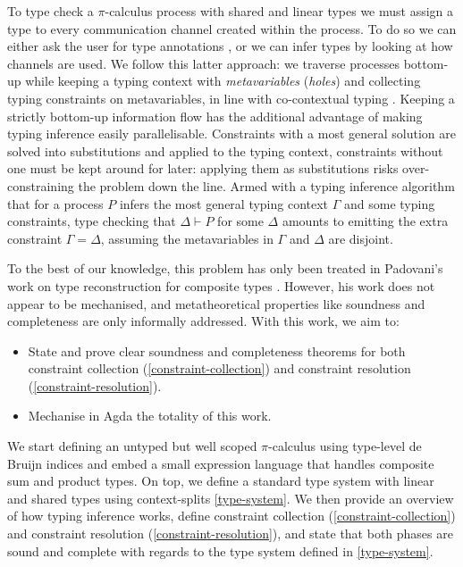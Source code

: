 \documentclass[sigplan,screen,review]{acmart}
\newcommand{\picalc}{$\pi$-calculus}
\begin{document}
To type check a \picalc{} process with shared and linear types we must assign a type to every communication channel created within the process.
To do so we can either ask the user for type annotations \cite{ZalakainD21}, or we can infer types by looking at how channels are used.
We follow this latter approach: we traverse processes bottom-up while keeping a typing context with \emph{metavariables} (\emph{holes}) and collecting typing constraints on metavariables, in line with co-contextual typing \cite{ErdwegBKKM15}.
Keeping a strictly bottom-up information flow has the additional advantage of making typing inference easily parallelisable.
Constraints with a most general solution are solved into substitutions and applied to the typing context, constraints without one must be kept around for later: applying them as substitutions risks over-constraining the problem down the line.
Armed with a typing inference algorithm that for a process $P$ infers the most general typing context $\Gamma$ and some typing constraints, type checking that $\Delta \vdash P$ for some $\Delta$ amounts to emitting the extra constraint $\Gamma = \Delta$, assuming the metavariables in $\Gamma$ and $\Delta$ are disjoint.

To the best of our knowledge, this problem has only been treated in Padovani's work on type reconstruction for composite types \cite{Padovani15}.
However, his work does not appear to be mechanised, and metatheoretical properties like soundness and completeness are only informally addressed.
With this work, we aim to:
\begin{itemize}
  \item State and prove clear soundness and completeness theorems for both constraint collection (\autoref{constraint-collection}) and constraint resolution (\autoref{constraint-resolution}).
  \item Mechanise in Agda the totality of this work.
\end{itemize}

We start defining an untyped but well scoped \picalc{} using type-level de Bruijn indices \cite{deBruijn72} and embed a small expression language that handles composite sum and product types.
On top, we define a standard type system with linear and shared types using context-splits \autoref{type-system}.
We then provide an overview of how typing inference works, define constraint collection (\autoref{constraint-collection}) and constraint resolution (\autoref{constraint-resolution}), and state that both phases are sound and complete with regards to the type system defined in \autoref{type-system}.
\end{document}
